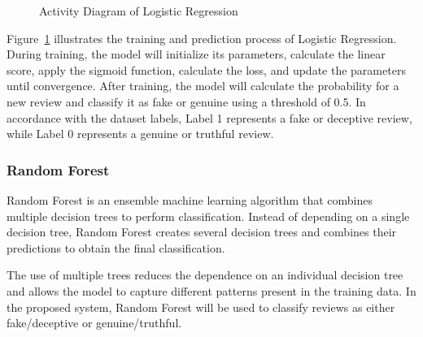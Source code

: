 \documentclass[12pt,a4paper]{report}
\begin{document}
\begin{figure}[H]

\caption{Activity Diagram of Logistic Regression}
\label{fig:logistic_activity}
\end{figure}

Figure~\ref{fig:logistic_activity} illustrates the training and prediction process of Logistic Regression. During training, the model will initialize its parameters, calculate the linear score, apply the sigmoid function, calculate the loss, and update the parameters until convergence. After training, the model will calculate the probability for a new review and classify it as fake or genuine using a threshold of 0.5. In accordance with the dataset labels, Label 1 represents a fake or deceptive review, while Label 0 represents a genuine or truthful review.


\subsubsection*{Random Forest}

Random Forest is an ensemble machine learning algorithm that combines multiple decision trees to perform classification. Instead of depending on a single decision tree, Random Forest creates several decision trees and combines their predictions to obtain the final classification.

The use of multiple trees reduces the dependence on an individual decision tree and allows the model to capture different patterns present in the training data. In the proposed system, Random Forest will be used to classify reviews as either fake/deceptive or genuine/truthful.
\end{document}
